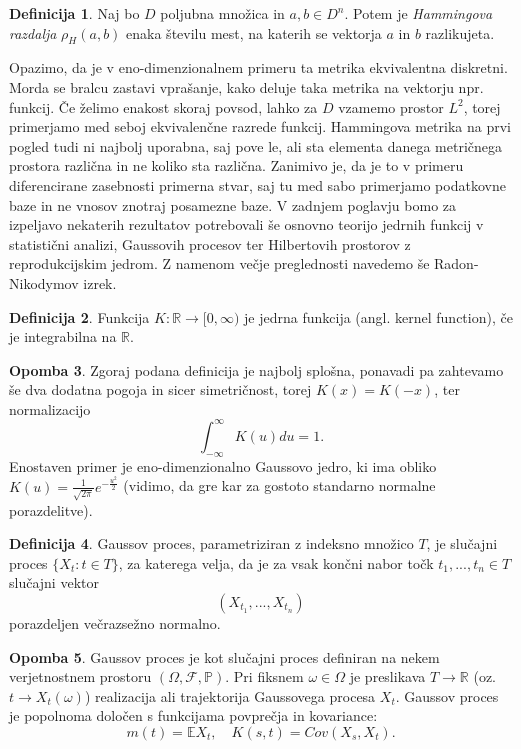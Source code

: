 \documentclass[12pt,a4paper]{amsart}
\theoremstyle{definition} %
\newtheorem{definicija}{Definicija}[section]
\newtheorem{opomba}[definicija]{Opomba}
\theoremstyle{plain} %
\begin{document}
\begin{definicija}
Naj bo $D$ poljubna množica in $a , b \in D^n$. Potem je  \textit{Hammingova razdalja} $\rho_H(a,b)$ enaka številu mest, na katerih se vektorja $a$ in $b$ razlikujeta.
\end{definicija}
Opazimo, da je v eno-dimenzionalnem primeru  ta metrika ekvivalentna diskretni. Morda se bralcu zastavi vprašanje, kako deluje taka metrika na vektorju npr. funkcij. Če želimo enakost skoraj povsod, lahko za $D$ vzamemo prostor $L^2$, torej primerjamo med seboj ekvivalenčne razrede funkcij.  Hammingova metrika na prvi pogled tudi ni najbolj uporabna, saj pove le, ali sta elementa danega metričnega prostora različna in ne koliko sta različna. Zanimivo je, da je to v primeru diferencirane zasebnosti primerna stvar, saj tu med sabo primerjamo podatkovne baze in ne vnosov znotraj posamezne baze. 
\newline
\newline
V zadnjem poglavju bomo za izpeljavo nekaterih rezultatov potrebovali še osnovno teorijo jedrnih funkcij v statistični analizi, Gaussovih procesov ter Hilbertovih prostorov z reprodukcijskim jedrom. Z namenom večje preglednosti navedemo še Radon-Nikodymov izrek.
\begin{definicija}
Funkcija $K: \mathbb{R} \to [0, \infty)$ je jedrna funkcija (angl. kernel function), če je integrabilna na $\mathbb{R}$.
\end{definicija}
\begin{opomba}
Zgoraj podana definicija je najbolj splošna, ponavadi pa zahtevamo še dva dodatna pogoja in sicer simetričnost, torej $K(x) = K(-x)$, ter normalizacijo
$$
\int_{-\infty}^{\infty} K(u)du=1.
$$
Enostaven primer je eno-dimenzionalno Gaussovo jedro, ki ima obliko $K(u)=\frac{1}{\sqrt{2\pi}}e^{-\frac{u^2}{2}}$ (vidimo, da gre kar za gostoto standarno normalne porazdelitve).
\end{opomba}
\begin{definicija}
Gaussov proces, parametriziran z indeksno množico $T$, je slučajni proces $\{X_t : t \in T\}$, za katerega velja, da je za vsak končni nabor točk $t_1,...,t_n \in T$ slučajni vektor
$$
(X_{t_1},...,X_{t_n})
$$
porazdeljen večrazsežno normalno.
\end{definicija}
\begin{opomba}
Gaussov proces je kot slučajni proces definiran na nekem verjetnostnem prostoru  $(\Omega, \mathcal{F}, \mathbb{P})$. Pri fiksnem $\omega \in \Omega$ je preslikava $T \rightarrow \mathbb{R}$ (oz. $t \rightarrow X_t(\omega)$) realizacija ali trajektorija Gaussovega procesa $X_t$. Gaussov proces je popolnoma določen s funkcijama povprečja  in kovariance: 
$$m(t) = \mathbb{E}X_t, \quad K(s,t) = Cov(X_s,X_t).$$
\end{opomba}
\end{document}
